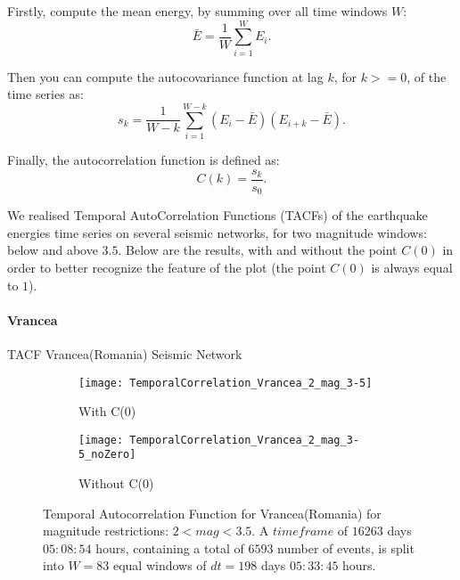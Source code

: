 Firstly, compute the mean energy, by summing over all time windows $W$:
\begin{equation}
\bar{E} = \frac{1}{W}\sum_{i=1}^{W}E_i.
\end{equation}

Then you can compute the autocovariance function at lag $k$, for $k>=0$, of the time series as:
\begin{equation}
s_k = \frac{1}{W-k}\sum_{i=1}^{W-k} (E_i-\bar{E})(E_{i+k}-\bar{E}).
\end{equation}

Finally, the autocorrelation function is defined as:
\begin{equation}
C(k) = \frac{s_k}{s_0}.
\end{equation}

We realised Temporal AutoCorrelation Functions (TACFs) of the earthquake energies time series on several seismic networks, for two magnitude windows: below and above $3.5$. Below are the results, with and without the point $C(0)$ in order to better recognize the feature of the plot (the point $C(0)$ is always equal to $1$).


\paragraph{Vrancea} TACF Vrancea(Romania) Seismic Network

\begin{figure}[!ht]
\begin{subfigure}{.5\textwidth}
  \centering
  \texttt{[image: TemporalCorrelation\_Vrancea\_2\_mag\_3-5]}
  \caption{With C(0)}
  \label{fig:corrVrancea2_3.5}
\end{subfigure}%
\begin{subfigure}{.5\textwidth}
  \centering
  \texttt{[image: TemporalCorrelation\_Vrancea\_2\_mag\_3-5\_noZero]}
  \caption{Without C(0)}
  \label{fig:corrVrancea2_3.5_noZero}
\end{subfigure}
\caption{Temporal Autocorrelation Function for Vrancea(Romania) for magnitude restrictions: $2<mag<3.5$. A $timeframe$ of $16263$ days $05:08:54$ hours, containing a total of $6593$ number of events, is split into $W=83$ equal windows of $dt=198$ days $05:33:45$ hours.}
\label{fig:corrVrancea2_3.5!}
\end{figure}

